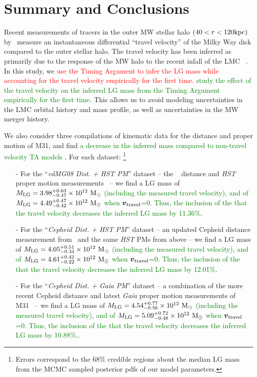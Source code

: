 \documentclass[twocolumn]{aastex631}
\newcommand{\remove}[1]{\textcolor{red}{#1}}
\newcommand{\add}[1]{\textcolor{green}{#1}}
\newcommand{\mlg}{\ensuremath{M_{\rm LG}}}
\newcommand{\bov}{\ensuremath{\boldsymbol{v}}}
\newcommand{\vtrav}{\ensuremath{\bov_{\rm travel}}}
\begin{document}

\section{Summary and Conclusions}
\label{sec:summary}
Recent measurements of tracers in the outer MW stellar halo $(40<r<120\mathrm{kpc})$
by~\cite{Petersen2021} measure an instantaneous differential ``travel velocity''
of the Milky Way disk compared to the outer stellar halo.
The travel velocity has been inferred as primarily due to the response of the
MW halo to the recent infall of the LMC
~\cite[as shown in e.g.][]{Gomez2015,Garavito-Camargo:2019,Erkal2019,
Cunningham:2020,Petersen:2020,Garavito-Camargo2021b}.
In this study, we
\remove{use the Timing Argument to infer the LG mass while
accounting for the travel velocity empirically for the first time.}
\add{study the effect of the travel velocity on the inferred LG mass from the
Timing Argument empirically for the first time.}
This allows us to avoid modeling uncertainties in the LMC orbital
history and mass profile, as well as uncertainties in the MW merger history.

We also consider three compilations of kinematic data for the distance and
proper motion of M31, and find \add{a decrease in the inferred mass compared to
non-travel velocity TA models} . For each
dataset:
\footnote{Errors correspond to the 68\% credible regions about
the median LG mass from the MCMC sampled posterior pdfs
of our model parameters.}
\begin{itemize}
  \item[-] For the ``\textit{vdMG08 Dist. + HST PM}'' dataset -- the
  ~\cite{vdm2008} distance and \textit{HST} proper motion
  measurements~\citep{Sohn:2012,vdm2012} -- we find a
  LG mass of $\mlg = 3.98^{+0.63}_{-0.47}\times10^{12}~\Msun$
  \add{(including the measured travel velocity), and of
  $\mlg = 4.49^{+0.47}_{-0.42}\times10^{12}~\Msun$ when $\vtrav$=0.
  Thus, the inclusion of the that the travel velocity decreases the inferred
  LG mass by 11.36\%}.
  \item[-] For the ``\textit{Cepheid Dist. + HST PM}'' dataset -- an updated
  Cepheid distance measurement from~\cite{Li2021} and the same \textit{HST} PMs
  from above --
  we find a LG mass of $\mlg = 4.05^{+0.51}_{-0.34}\times10^{12}~\Msun$
  \add{(including the measured travel velocity), and of
  $\mlg = 4.61^{+0.42}_{-0.22}\times10^{12}~\Msun$ when $\vtrav$=0.
  Thus, the inclusion of the that the travel velocity decreases the inferred
  LG mass by 12.01\%}.

  \item[-] For the ``\textit{Cepheid Dist. + Gaia PM}'' dataset -- a combination
  of the more recent Cepheid distance and latest \textit{Gaia} proper motion
  measurements of M31~\citep{Li2021,Salomon2021} --
  we find a LG mass of $\mlg = 4.54^{+0.77}_{-0.56}\times10^{12}~\Msun$
  \add{(including the measured travel velocity), and of
  $\mlg = 5.09^{+0.72}_{-0.48}\times10^{12}~\Msun$ when $\vtrav$=0.
  Thus, the inclusion of the that the travel velocity decreases the inferred
  LG mass by 10.88\%}..
\end{itemize}
\end{document}
